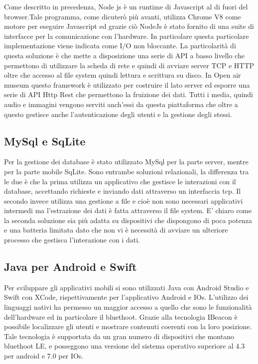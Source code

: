 	Come descritto in precedenza, Node js è un runtime di Javascript al di fuori del browser.Tale programma, come dicuterò più avanti, utilizza Chrome V8\cite{V8} come motore per eseguire Javascript ed grazie ciò NodeJs è stato fornito di una suite di interfacce per la comunicazione con l'hardware. In particolare questa particolare implementazione viene indicata come I/O non bloccante\cite{AsincIO}. La particolarità di questa soluzione è che mette a disposizione una serie di API a basso livello che permettono di utilizzare la scheda di rete e quindi di avviare server TCP e HTTP oltre che accesso al file system quindi lettura e scrittura su disco. In Open air museum questo framework è utilizzato per costruire il lato server ed esporre una serie di API Http Rest che permettono la fruizione dei dati. Tutti i media, quindi audio e immagini vengono serviti anch’essi da questa piattaforma che oltre a questo gestisce anche l’autenticazione degli utenti e la gestione degli stessi. \vspace{5mm}
	
	\subsection{MySql e SqLite}\vspace{5mm}
	
	Per la gestione dei database è stato utilizzato MySql per la parte server, mentre per la parte mobile SqLite. Sono entrambe soluzioni relazionali, la differenza tra le due è che la prima utilizza un applicativo che gestisce le interazioni con il database, accettando richieste e inviando dati attraverso un interfaccia tcp. Il secondo invece utilizza una gestione a file e cioè non sono necessari applicativi intermedi ma l'estrazione dei dati è fatta attraverso il file system. E' chiaro come la seconda soluzione sia più adatta su dispositivi che dispongono di poca potenza e una batteria limitata dato che non vi è necessità di avviare un ulteriore processo che gestisca l'interazione con i dati.
	
	\subsection{Java per Android e Swift}\vspace{5mm}
	
	Per sviluppare gli applicativi mobili si sono utilizzati Java con Android Studio e Swift con XCode, rispettivamente per l'applicativo Android e IOs. L'utilizzo dei linguaggi nativi ha permesso un maggior accesso a quello che sono le funzionalità dell'hardware ed in particolare il bluethoot. Grazie alla tecnologia IBeacon è possibile localizzare gli utenti e mostrare contenuti coerenti con la loro posizione. Tale tecnologia è supportata da un gran numero di dispositivi che montano bluethoot LE, e posseggono una versione del sistema operativo superiore al 4.3 per android e 7.0 per IOs.
	
